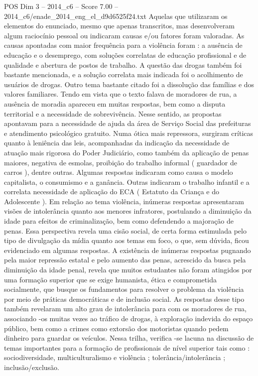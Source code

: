 \begin{textsample}{POS Dim 3 – 2014\_c6 – Score 7.00 – 2014\_c6/enade\_2014\_eng\_el\_d9d6525f24.txt}
Aquelas que utilizaram os elementos do enunciado, mesmo que apenas transcritos, mas desenvolveram algum raciocínio pessoal ou indicaram causas e/ou fatores foram valoradas.
As causas apontadas com maior frequência para a violência foram : a ausência de educação e o desemprego, com soluções correlatas de educação profissional e de qualidade e abertura de postos de trabalho.
A questão das drogas também foi bastante mencionada, e a solução correlata mais indicada foi o acolhimento de usuários de drogas.
Outro tema bastante citado foi a dissolução das famílias e dos valores familiares.
Tendo em vista que o texto falava de moradores de rua, a ausência de moradia apareceu em muitas respostas, bem como a disputa territorial e a necessidade de sobrevivência.
Nesse sentido, as propostas apontavam para a necessidade de ajuda da área de Serviço Social das prefeituras e atendimento psicológico gratuito.
Numa ótica mais repressora, surgiram críticas quanto à leniência das leis, acompanhadas da indicação da necessidade de atuação mais rigorosa do Poder Judiciário, como também da aplicação de penas maiores, negativa de esmolas, proibição do trabalho informal ( guardador de carros ), dentre outras.
Algumas respostas indicaram como causa o modelo capitalista, o consumismo e a ganância.
Outras indicaram o trabalho infantil e a correlata necessidade de aplicação do ECA ( Estatuto da Criança e do Adolescente ).
Em relação ao tema violência, inúmeras respostas apresentaram visões de intolerância quanto aos menores infratores, postulando a diminuição da idade para efeitos de criminalização, bem como defendendo a majoração de penas.
Essa perspectiva revela uma cisão social, de certa forma estimulada pelo tipo de divulgação da mídia quanto aos temas em foco, o que, sem dúvida, ficou evidenciado em algumas respostas.
A existência de inúmeras respostas pugnando pela maior repressão estatal e pelo aumento das penas, acrescido da busca pela diminuição da idade penal, revela que muitos estudantes não foram atingidos por uma formação superior que se exige humanista, ética e comprometida socialmente, que busque os fundamentos para resolver o problema da violência por meio de práticas democráticas e de inclusão social.
As respostas desse tipo também revelaram um alto grau de intolerância para com os moradores de rua, associando -os muitas vezes ao tráfico de drogas, à exploração indevida do espaço público, bem como a crimes como extorsão dos motoristas quando pedem dinheiro para guardar os veículos.
Nessa trilha, verifica -se lacuna na discussão de temas importantes para a formação de profissionais de nível superior tais como : sociodiversidade, multiculturalismo e violência ; tolerância/intolerância ; inclusão/exclusão.

\end{textsample}
